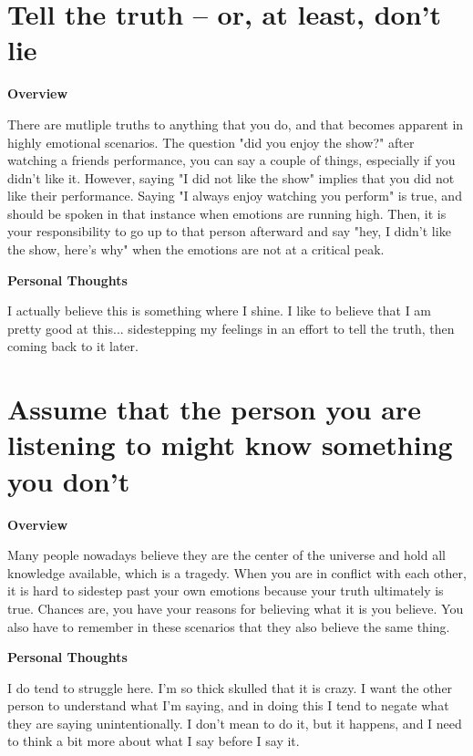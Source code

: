 \documentclass{article}
\begin{document}
\section{Tell the truth – or, at least, don't lie}
        \begin{multicols}{2}
        \begin{center}
            \textbf{Overview}
        \end{center}
        
        There are mutliple truths to anything that you do, and that becomes apparent in highly emotional scenarios. The question "did you enjoy the show?" after watching a friends performance, you can say a couple of things, especially if you didn't like it. However, saying "I did not like the show" implies that you did not like their performance. Saying "I always enjoy watching you perform" is true, and should be spoken in that instance when emotions are running high. Then, it is your responsibility to go up to that person afterward and say "hey, I didn't like the show, here's why" when the emotions are not at a critical peak.

        \begin{center}
            \textbf{Personal Thoughts}
        \end{center}
        
        I actually believe this is something where I shine. I like to believe that I am pretty good at this... sidestepping my feelings in an effort to tell the truth, then coming back to it later.
    \end{multicols}
    
\section{Assume that the person you are listening to might know something you don't}
        \begin{multicols}{2}
        \begin{center}
            \textbf{Overview}
        \end{center}
        
        Many people nowadays believe they are the center of the universe and hold all knowledge available, which is a tragedy. When you are in conflict with each other, it is hard to sidestep past your own emotions because your truth ultimately is true. Chances are, you have your reasons for believing what it is you believe. You also have to remember in these scenarios that they also believe the same thing. 

        \begin{center}
            \textbf{Personal Thoughts}
        \end{center}
        
        I do tend to struggle here. I'm so thick skulled that it is crazy. I want the other person to understand what I'm saying, and in doing this I tend to negate what they are saying unintentionally. I don't mean to do it, but it happens, and I need to think a bit more about what I say before I say it.
    \end{multicols}
\end{document}
